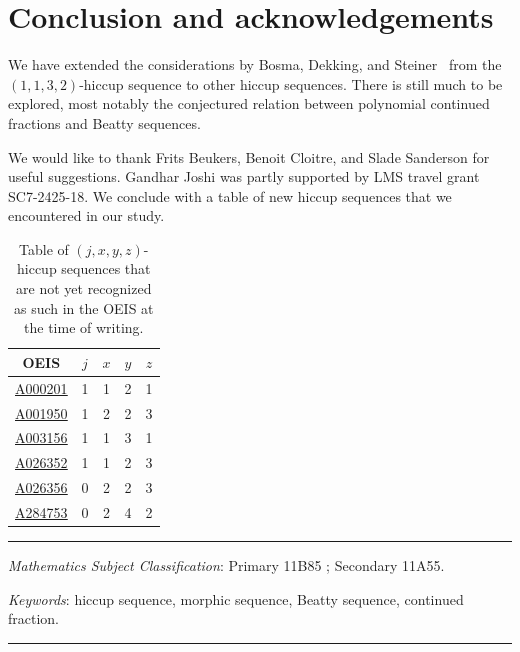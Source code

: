 \documentclass[12pt,reqno]{article}
\newcommand{\seqnum}[1]{\href{https://oeis.org/#1}{\rm \underline{#1}}}
\begin{document}
\section{Conclusion and acknowledgements}

We have extended the considerations by Bosma, Dekking, and Steiner~\cite{bosma2018} 
from the $(1,1,3,2)$-hiccup sequence to other hiccup sequences.
There is
still much to be explored, most notably the conjectured relation between
polynomial continued fractions and Beatty sequences.



\medbreak
We would like to thank Frits Beukers, Benoit Cloitre, 
and Slade Sanderson for useful suggestions.
Gandhar Joshi was partly supported by LMS travel grant SC7-2425-18.
We conclude with a table of new hiccup sequences that we encountered in our
study.

\begin{table}[h!]
\centering
\small
\begin{tabular}{|c|c|c|c|c|}
\hline
\textbf{OEIS} & $j$ & $x$ & $y$ & $z$ \\
\hline
\seqnum{A000201} &1&1&2&1\\
\seqnum{A001950} &1&2&2&3\\
\seqnum{A003156} &1& 1 & 3 & 1 \\
\seqnum{A026352}&1&1&2&3\\
\seqnum{A026356}&0&2&2&3\\
\seqnum{A284753}&0&2&4&2\\
\hline
\end{tabular}


\caption{Table of $(j,x,y,z)$-hiccup sequences that are not yet recognized as
such in the OEIS at the time of writing. 
}\label{tbl:end}
\end{table}







\bigskip
\hrule
\bigskip
{} {\it Mathematics Subject Classification}:
Primary 11B85 ; Secondary 11A55.

\noindent \emph{Keywords}: hiccup sequence, morphic sequence, Beatty sequence, continued fraction. 

\bigskip
\hrule
\bigskip
\end{document}
